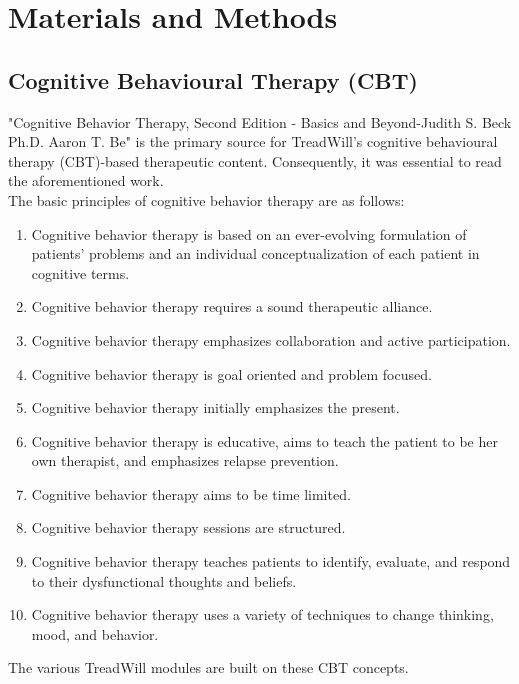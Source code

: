 \section{Materials and Methods}

\subsection{Cognitive Behavioural Therapy (CBT)}
\normalsize{
"Cognitive Behavior Therapy, Second Edition - Basics and Beyond-Judith S. Beck Ph.D. Aaron T. Be" is the primary source for TreadWill's cognitive behavioural therapy (CBT)-based therapeutic content.\cite{beck2011cognitive}
Consequently, it was essential to read the aforementioned work.\\
The basic principles of cognitive behavior therapy are as follows:}
\begin{enumerate}
    \item Cognitive behavior therapy is based on an ever-evolving formulation of patients’ problems and an individual conceptualization of each patient in cognitive terms.
    \item Cognitive behavior therapy requires a sound therapeutic alliance.
    \item Cognitive behavior therapy emphasizes collaboration
and active participation.
    \item Cognitive behavior therapy is goal oriented and problem
focused.
    \item Cognitive behavior therapy initially emphasizes the present.
    \item Cognitive behavior therapy is educative, aims to teach
the patient to be her own therapist, and emphasizes relapse prevention.
    \item Cognitive behavior therapy aims to be time limited.
    \item Cognitive behavior therapy sessions are structured.
    \item Cognitive behavior therapy teaches patients to identify,
evaluate, and respond to their dysfunctional thoughts and beliefs.
    \item Cognitive behavior therapy uses a variety of techniques to change thinking, mood, and behavior. \cite{beck2011cognitive}
\end{enumerate}
\normalsize{
The various TreadWill modules are built on these CBT concepts.
}\\

